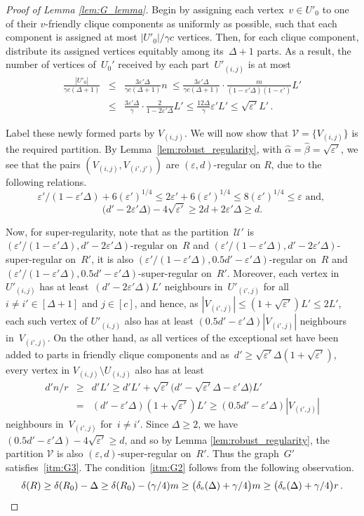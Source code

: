 \documentclass[final]{article}
\theoremstyle{definition}
\newcommand{\eps}{\varepsilon}
\newcommand{\exth}{\delta_{\rm e}(\Delta)}
\begin{document}
\begin{proof}[Proof of Lemma \ref{lem:G_lemma}]
Begin by assigning each vertex~$v \in U'_0$ to one of their $v$-friendly clique components as uniformly as possible, such that each component is assigned at most $|U'_0|/\gamma c$ vertices. Then, for each clique component, distribute its assigned vertices equitably among its~$\Delta+1$ parts. As a result, the number of vertices of~$U_0'$ received by each part~$U'_{(i,j)}$ is at most 
\begin{eqnarray*}
    \frac{|U'_0|}{\gamma c(\Delta+1)} &\leq& \frac{3 \eps'\Delta}{\gamma c (\Delta + 1)}n \ \leq  \frac{3\eps' \Delta}{\gamma c (\Delta+1)} \cdot \frac{m}{(1-\eps'\Delta)(1-\eps')} L'\\
    &\leq& \frac{3\eps' \Delta}{\gamma}\cdot \frac{2}{1- 2\eps'\Delta}L'\leq \frac{12\Delta}{\gamma} \eps' L' \leq \sqrt{\eps'}L'\, .
\end{eqnarray*}

Label these newly formed parts by $V_{(i,j)}$. We will now show that $\mathcal{V} = \{V_{(i,j)}\}$ is the required partition. By Lemma~\ref{lem:robust_regularity}, with $\hat{\alpha} = \hat{\beta} = \sqrt{\eps'}$, we see that the pairs $(V_{(i,j)}, V_{(i',j')})$ are $(\eps, d)$-regular on $R$, due to the following relations. 
$${\eps'}/({1-\eps'\Delta}) + 6(\eps')^{1/4} \leq 2\eps' + 6(\eps')^{1/4} \leq 8(\eps')^{1/4} \leq \eps \text{ and, }$$
$$ \big(d' - 2\eps'\Delta\big) - 4\sqrt{\eps'} \geq 2d + 2\eps'\Delta \geq d.$$

Now, for super-regularity, note that as the partition~$\mathcal{U}'$ is $(\eps'/(1-\eps'\Delta),d'-2\eps'\Delta)$-regular on~$R$ and $(\eps'/(1-\eps'\Delta), d'-2\eps'\Delta)$-super-regular on~$R'$, it is also $(\eps'/(1-\eps'\Delta), 0.5 d'-\eps'\Delta)$-regular on~$R$ and $(\eps'/(1-\eps'\Delta), 0.5d'-\eps'\Delta)$-super-regular on~$R'$. Moreover, each vertex in~$U'_{(i,j)}$ has at least~$(d' - 2\eps'\Delta)L'$ neighbours in~$U'_{(i',j)}$ for all $i \neq i' \in [\Delta+1]$ and $j \in [c]$, and hence, as $|V_{(i',j)}| \le (1+\sqrt{\eps'})L' \leq 2L'$, each such vertex of $U'_{(i,j)}$ also has at least $(0.5d' - \eps'\Delta)|V_{(i',j)}|$ neighbours in~$V_{(i',j)}$. On the other hand, as all vertices of the exceptional set have been added to parts in friendly clique components and as~$d' \geq \sqrt{\eps'}\Delta(1 + \sqrt{\eps'})$, every vertex in $V_{(i,j)}\setminus U_{(i,j)}$ also has at least 
\begin{eqnarray*}
    d'n/r &\geq& d'L' \geq d'L' + \sqrt{\eps'}\big(d' - \sqrt{\eps'}\Delta - \eps'\Delta\big)L'\\
    &=&(d'-\eps'\Delta)(1 + \sqrt{\eps'})L' \geq (0.5d' - \eps'\Delta)|V_{(i',j)}|
\end{eqnarray*} 
neighbours in~$V_{(i',j)}$ for~$i\neq i'$. Since $\Delta \geq 2$, we have $(0.5d' - \eps'\Delta) - 4\sqrt{\eps'} \geq d$, and so by Lemma \ref{lem:robust_regularity}, the partition $\mathcal{V}$ is also $(\eps, d)$-super-regular on~$R'$. Thus the graph~$G'$ satisfies~\ref{itm:G3}. The condition~\ref{itm:G2} follows from the following observation.
$$\delta(R) \geq \delta(R_0) - \Delta \geq \delta(R_0) - (\gamma/4)m \geq \bigl( \exth + \gamma/4\bigr)m \geq \bigl(\exth + \gamma/4\bigr)r\,.$$ 


\end{proof}
\end{document}

